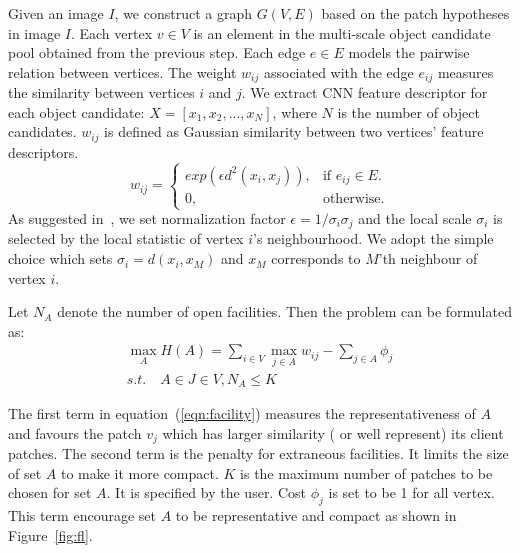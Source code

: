 \documentclass[10pt,twocolumn,letterpaper]{article}
\begin{document}
Given an image $I$, we construct a graph $G(V,E)$ based on the patch hypotheses in image $I$. Each vertex $v\in V$ is an element in the multi-scale object candidate pool obtained from the previous step. Each edge $e \in E$ models the pairwise relation between vertices. The weight $w_{ij}$ associated with the edge $e_{ij}$ measures the similarity between vertices $i$ and $j$. We extract CNN feature descriptor for each object candidate: $X=[x_1,x_2,...,x_N]$, where $N$ is the number of object candidates. $w_{ij}$ is defined as Gaussian similarity between two vertices' feature descriptors. 
\begin{equation}
  w_{ij}=\begin{cases}
    exp(\epsilon d^2(x_i,x_j)), & \text{if $e_{ij}\in E$}.\\
    0, & \text{otherwise}.
  \end{cases}
\end{equation}
As suggested in~\cite{Zelnik04}, we set normalization factor $\epsilon=1/\sigma_i \sigma_j$ and the local scale $\sigma_i$ is selected by the local statistic of vertex $i$'s neighbourhood. We adopt the simple choice which sets $\sigma_i=d(x_i,x_M)$ and $x_M$ corresponds to $M$'th neighbour of vertex $i$. 

Let $N_A$ denote the number of open facilities. Then the problem can be formulated as:
\begin{eqnarray}
\label{eqn:facility}
\max_{A}H(A)=\sum_{i\in V}\max_{j \in A}w_{ij}-\sum_{j\in A}\phi_j \\
s.t. \quad A \in J \in V, N_A\leqslant K \nonumber
\end{eqnarray}

The first term in equation~(\ref{eqn:facility}) measures the representativeness of $A$ and favours the patch $v_j$ which has larger similarity ( or well represent) its client patches. The second term is the penalty for extraneous facilities. It limits the size of set $A$ to make it more compact. $K$ is the maximum number of patches to be chosen for set $A$. It is specified by the user. Cost $\phi_j$ is set to be 1 for all vertex. This term encourage set $A$ to be representative and compact as shown in Figure~\ref{fig:fl}.
\end{document}
